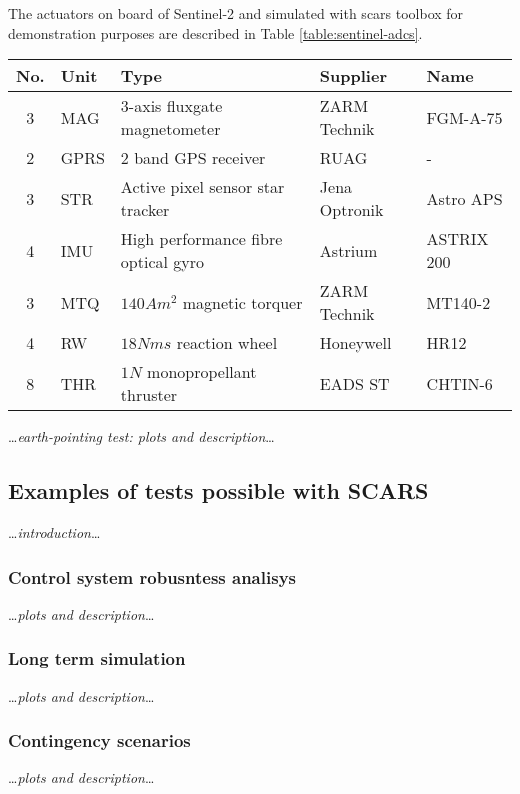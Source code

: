     The actuators on board of Sentinel-2 and simulated with \ac{scars} toolbox for demonstration purposes are described in Table \ref{table:sentinel-adcs}.

        
    \begin{center}    
        \small
        \begin{tabularx}{\textwidth}{ c l X l l }
            \textbf{No.} & \textbf{Uni}t & \textbf{Type} & \textbf{Supplier} & \textbf{Name} \\ \hline
            3 & MAG & 3-axis fluxgate magnetometer & ZARM Technik & FGM-A-75 \\
            2 & GPRS & 2 band GPS receiver & RUAG & - \\
            3 & STR  & Active pixel sensor star tracker & Jena Optronik & Astro APS \\
            4 & IMU & High performance fibre optical gyro & Astrium & ASTRIX 200 \\
            3 & MTQ & $140 Am^2$ magnetic torquer & ZARM Technik & MT140-2\\
            4 & RW & $18 Nms$ reaction wheel & Honeywell & HR12 \\
            8 & THR & $1N$ monopropellant thruster & EADS ST &CHTIN-6
        \end{tabularx}
    \end{center}\label{table:sentinel-adcs}

    \dots\textit{earth-pointing test: plots and description}\dots

\subsection{Examples of tests possible with SCARS}
    \dots\textit{introduction}\dots

    \subsubsection{Control system robusntess analisys}
        \dots\textit{plots and description}\dots

    \subsubsection{Long term simulation}
        \dots\textit{plots and description}\dots

    \subsubsection{Contingency scenarios}
        \dots\textit{plots and description}\dots
